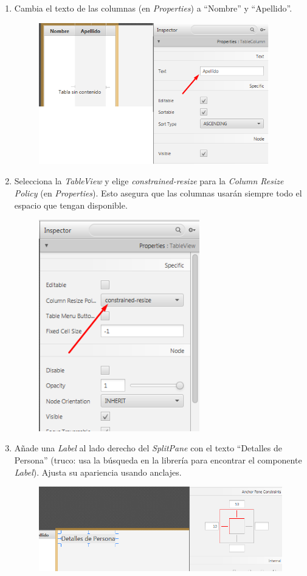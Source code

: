 \begin{enumerate}
	\item Cambia el texto de las columnas (en \textit{Properties}) a “Nombre” y “Apellido”.
	\begin{figure}[H]
		\includegraphics[width=10cm]{img/nombreApellido}
	\end{figure}
	\item Selecciona la \textit{TableView} y elige \textit{constrained-resize} para la \textit{Column Resize Policy} (en \textit{Properties}). Esto asegura que las columnas usarán siempre todo el espacio que tengan disponible.
	\begin{figure}[H]
		\includegraphics[width=7cm]{img/constraintRezise}
	\end{figure}
	\item Añade una \textit{Label} al lado derecho del \textit{SplitPane} con el texto “Detalles de Persona” (truco: usa la búsqueda en la librería para encontrar el componente \textit{Label}). Ajusta su apariencia usando anclajes.
	\begin{figure}[H]
		\includegraphics[width=13cm]{img/detallesPersona}

\end{figure}
\end{enumerate}
